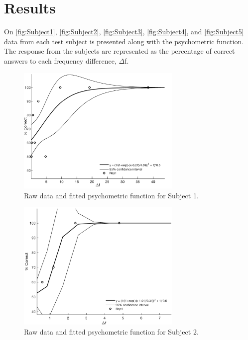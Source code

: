 \section*{Results}
%
On \autoref{fig:Subject1}, \autoref{fig:Subject2}, \autoref{fig:Subject3}, \autoref{fig:Subject4}, and \autoref{fig:Subject5} data from each test subject is presented along with the psychometric function. The response from the subjects are represented as the percentage of correct answers to each frequency difference, $\Delta$f.
% 
\begin{figure}[htb]
\centering
\includegraphics[width = 0.7\textwidth]{Figure/Vores_Figurer/Subject1.png} 
\caption{Raw data and fitted psychometric function for Subject 1.}
\label{fig:Subject1}
\end{figure}
%
\begin{figure}[htb]
\centering
\includegraphics[width = 0.7\textwidth]{Figure/Vores_Figurer/Subject2.png} 
\caption{Raw data and fitted psychometric function for Subject 2.}
\label{fig:Subject2}
\end{figure}
%

